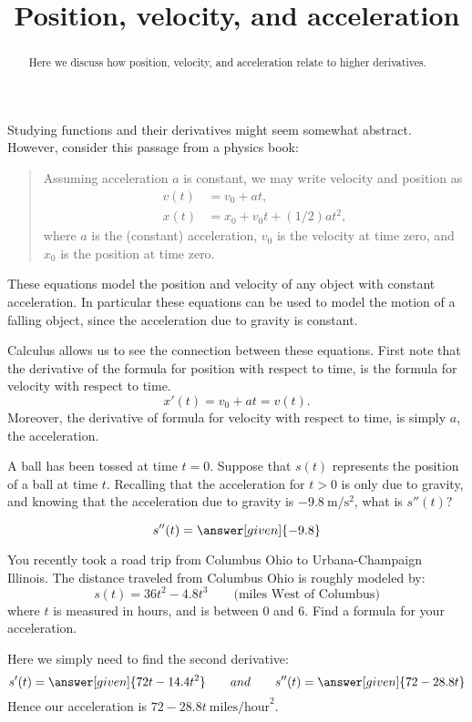 \documentclass{ximera}
\title[Dig-In:]{Position, velocity, and acceleration}
\begin{document}
\begin{abstract}
  Here we discuss how position, velocity, and acceleration relate to
  higher derivatives.
\end{abstract}
\maketitle

Studying functions and their derivatives might seem somewhat
abstract. However, consider this passage from a physics book:
\begin{quote}
  Assuming acceleration $a$ is constant, we may write velocity and
  position as
  \begin{align*}
    v(t) &= v_0 + at,\\
    x(t) &= x_0 + v_0 t + (1/2) a t^2,
  \end{align*}
  where $a$ is the (constant) acceleration, $v_0$ is the velocity at
  time zero, and $x_0$ is the position at time zero.
\end{quote}
These equations model the position and velocity of any object with
constant acceleration. In particular these equations can be used to
model the motion of a falling object, since the acceleration due to
gravity is constant.

Calculus allows us to see the connection between these
equations. First note that the derivative of the formula for position with respect to time, is the formula for velocity with respect to
time.
\[
x'(t) = v_0 + at = v(t).
\]
Moreover, the derivative of formula for velocity with respect to time,
is simply $a$, the acceleration.

\begin{question}
  A ball has been tossed at time $t=0$.  Suppose that $s(t)$ represents the position of a ball at time $t$.
  Recalling that the acceleration for $t>0$ is only due to
  gravity, and knowing that the acceleration due to gravity is
  $-9.8~\mathrm{m}/\mathrm{s}^2$, what is $s''(t)$?
  \begin{prompt}
    \[
  s''(t) = \answer[given]{-9.8}
  \]
  \end{prompt}
\end{question}



\begin{example}
You recently took a road trip from Columbus Ohio to Urbana-Champaign
Illinois. The distance traveled from Columbus Ohio is roughly modeled
by:
\[
s(t) = 36t^2 -4.8t^3 \qquad\text{(miles West of Columbus)}
\]
where $t$ is measured in hours, and is between $0$ and $6$. Find a
formula for your acceleration.
  \begin{explanation}
    Here we simply need to find the second derivative:
    \[
    s'(t) = \answer[given]{72 t- 14.4 t^2} \qquad{and}\qquad s''(t) = \answer[given]{72 - 28.8t}
    \]
    Hence our acceleration is $72-28.8t~\text{miles/hour}^2$.
  \end{explanation}
\end{example}
\end{document}
